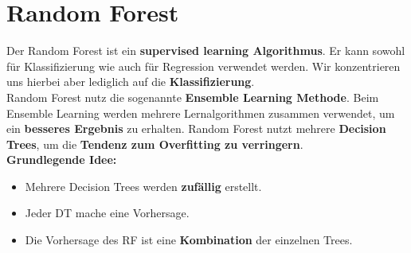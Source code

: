\newpage
\section{Random Forest}

Der Random Forest ist ein \textbf{supervised learning Algorithmus}. Er kann sowohl für Klassifizierung wie auch für Regression verwendet werden. Wir konzentrieren uns hierbei aber lediglich auf die \textbf{Klassifizierung}. \\

Random Forest nutz die sogenannte \textbf{Ensemble Learning Methode}. Beim Ensemble Learning werden mehrere Lernalgorithmen zusammen verwendet, um ein \textbf{besseres Ergebnis} zu erhalten. Random Forest nutzt mehrere \textbf{Decision Trees}, um die \textbf{Tendenz zum Overfitting zu verringern}. \\

\textbf{Grundlegende Idee:}\\
\begin{itemize}
	\item Mehrere Decision Trees werden \textbf{zufällig} erstellt.
	\item Jeder DT mache eine Vorhersage.
	\item Die Vorhersage des RF ist eine \textbf{Kombination} der einzelnen Trees.
\end{itemize}

